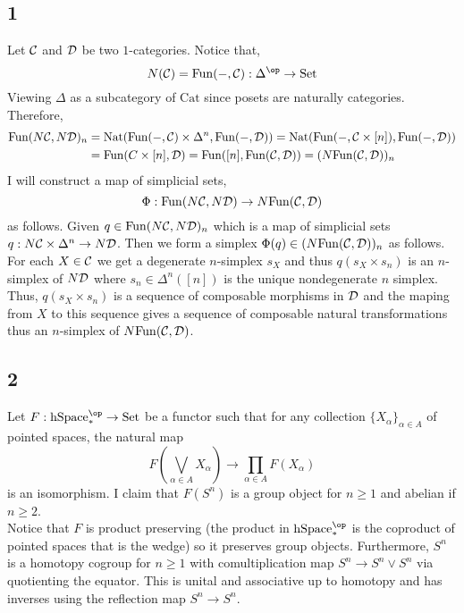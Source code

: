 \documentclass[12pt]{extarticle}
\begin{document}
\renewcommand{\S}{\mathbb{S}}

\subsection*{1}

Let $\mathcal{C}$ and $\mathcal{D}$ be two $1$-categories. Notice that,
\[ N(\C) = \mathrm{Fun}(-, \C) : \Delta^\op \to \mathrm{Set} \]
Viewing $\Delta$ as a subcategory of $\mathrm{Cat}$ since posets are naturally categories. Therefore,
\begin{align*}
\mathrm{Fun}(N \mathcal{C}, N \mathcal{D})_n & = \mathrm{Nat}(\mathrm{Fun}(-, \mathcal{C}) \times \Delta^n, \mathrm{Fun}(-, \mathcal{D})) = \mathrm{Nat}(\mathrm{Fun}(-, \mathcal{C} \times [n]), \mathrm{Fun}(-, \mathcal{D})) 
\\
& = \mathrm{Fun}(C \times [n], \mathcal{D}) = \mathrm{Fun}([n], \mathrm{Fun}(\mathcal{C}, \mathcal{D})) = (N \mathrm{Fun}(\mathcal{C}, \mathcal{D}))_n
\end{align*}
I will construct a map of simplicial sets,
\[ \Phi : \mathrm{Fun}(N \mathcal{C}, N \mathcal{D}) \to N \mathrm{Fun}(\mathcal{C}, \mathcal{D})  \]
as follows. Given $q \in \mathrm{Fun}(N \mathcal{C}, N \mathcal{D})_n$ which is a map of simplicial sets $q : N \mathcal{C} \times \Delta^n \to N \mathcal{D}$. Then we form a simplex $\Phi(q) \in (N \mathrm{Fun}(\mathcal{C}, \mathcal{D}))_n$ as follows. For each $X \in \mathcal{C}$ we get a degenerate $n$-simplex $s_X$ and thus $q(s_X \times s_n)$ is an $n$-simplex of $N \mathcal{D}$ where $s_n \in \Delta^n([n])$ is the unique nondegenerate $n$ simplex. Thus, $q(s_X \times s_n)$ is a sequence of composable morphisms in $\mathcal{D}$ and the maping from $X$ to this sequence gives a sequence of composable natural transformations thus an $n$-simplex of $N \mathrm{Fun}(\mathcal{C}, \mathcal{D})$.

\subsection*{2}

Let $F : \mathrm{hSpace}_*^{\op} \to \mathrm{Set}$ be a functor such that for any collection $\{ X_\alpha \}_{\alpha \in A}$ of pointed spaces, the natural map
\[ F \left( \bigvee_{\alpha \in A} X_\alpha \right) \to \prod_{\alpha \in A} F(X_\alpha) \]
is an isomorphism. I claim that $F(S^n)$ is a group object for $n \ge 1$ and abelian if $n \ge 2$. 
\bigskip\\
Notice that $F$ is product preserving (the product in $\mathrm{hSpace}_*^{\op}$ is the coproduct of pointed spaces that is the wedge) so it preserves group objects. Furthermore, $S^n$ is a homotopy cogroup for $n \ge 1$ with comultiplication map $S^n \to S^n \vee S^n$ via quotienting the equator. This is unital and associative up to homotopy and has inverses using the reflection map $S^n \to S^n$.
\end{document}
